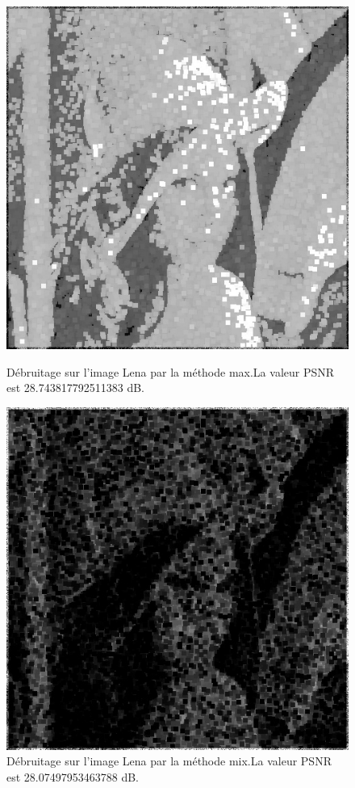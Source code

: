 \documentclass[12pt,a4paper]{report}
\numberwithin{equation}{subsection}
\numberwithin{equation}{section}
\begin{document}
\begin{figure}
  \begin{minipage}[t]{0.45\textwidth} %
    \includegraphics[width=\linewidth]{max_gauss_gris.jpg}
    \caption{Débruitage sur l’image Lena par la méthode max.\newline \newline La valeur PSNR est 28.743817792511383 dB.}
  \end{minipage}%
  \hfill
  \begin{minipage}[t]{0.45\textwidth}
    \includegraphics[width=\linewidth]{min_gauss_alpha.jpg}
    \caption{Débruitage sur l’image Lena par la méthode mix.\newline \newline La valeur PSNR est 28.07497953463788 dB.}
  \end{minipage}
\end{figure}
\end{document}
